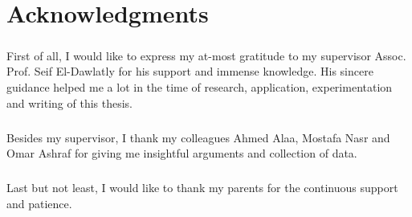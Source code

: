 \chapter*{Acknowledgments}\label{chap:acknowledgments}

\paragraph{}
First of all, I would like to express my at-most gratitude to my supervisor Assoc. Prof. Seif El-Dawlatly for his support and immense knowledge. His sincere guidance helped me a lot in the time of research, application, experimentation and writing of this thesis.

\paragraph{}
Besides my supervisor, I thank my colleagues Ahmed Alaa, Mostafa Nasr and Omar Ashraf for giving me insightful arguments and collection of data.

\paragraph{}
Last but not least, I would like to thank my parents for the continuous support and patience.